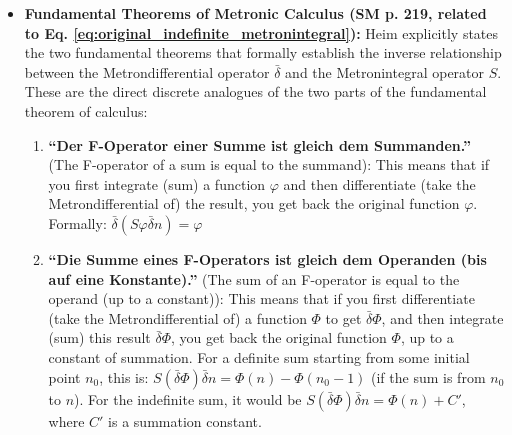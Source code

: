 \documentclass[12pt]{article}
\newcommand{\q}[1]{\enquote{#1}}
\newcommand{\metronintegral}{S}
\newcommand{\metronenziffer}{n}
\begin{document}
\begin{itemize}
    \item \textbf{Fundamental Theorems of Metronic Calculus (SM p. 219, related to Eq. \eqref{eq:original_indefinite_metronintegral}):}
    Heim explicitly states the two fundamental theorems that formally establish the inverse relationship between the Metrondifferential operator \( \bar{\delta} \) and the Metronintegral operator \( \metronintegral \). These are the direct discrete analogues of the two parts of the fundamental theorem of calculus:
    \begin{enumerate}
        \item \textbf{\q{Der F-Operator einer Summe ist gleich dem Summanden.}} (The F-operator of a sum is equal to the summand):
        This means that if you first integrate (sum) a function \( \varphi \) and then differentiate (take the Metrondifferential of) the result, you get back the original function \( \varphi \). Formally:
        \( \bar{\delta}(\metronintegral \varphi \bar{\delta}\metronenziffer) = \varphi \)
        \item \textbf{\q{Die Summe eines F-Operators ist gleich dem Operanden (bis auf eine Konstante).}} (The sum of an F-operator is equal to the operand (up to a constant)):
        This means that if you first differentiate (take the Metrondifferential of) a function \( \Phi \) to get \( \bar{\delta}\Phi \), and then integrate (sum) this result \( \bar{\delta}\Phi \), you get back the original function \( \Phi \), up to a constant of summation. For a definite sum starting from some initial point \( n_0 \), this is:
        \( \metronintegral (\bar{\delta}\Phi) \bar{\delta}\metronenziffer = \Phi(\metronenziffer) - \Phi(n_0-1) \) (if the sum is from \(n_0\) to \(n\)). For the indefinite sum, it would be \( \metronintegral (\bar{\delta}\Phi) \bar{\delta}\metronenziffer = \Phi(\metronenziffer) + C' \), where \(C'\) is a summation constant.
    \end{enumerate}


\end{itemize}
\end{document}
